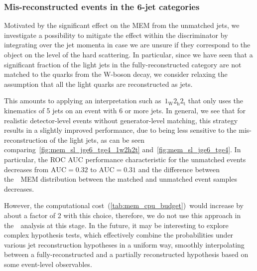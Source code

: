 \subsubsection{Mis-reconstructed events in the 6-jet categories}
Motivated by the significant effect on the MEM from the unmatched jets, we investigate a possibility to mitigate the effect within the discriminator by integrating over the jet momenta in case we are unsure if they correspond to the object on the level of the hard scattering. In particular, since we have seen that a significant fraction of the light jets in the fully-reconstructed category are not matched to the quarks from the W-boson decay, we consider relaxing the assumption that all the light quarks are reconstructed as jets.

This amounts to applying an interpretation such as~$1_{\mathrm{W}} 2_{\mathrm{h}} 2_{\mathrm{t}}$ that only uses the kinematics of 5 jets on an event with 6 or more jets. In general, we see that for realistic detector-level events without generator-level matching, this strategy results in a slightly improved performance, due to being less sensitive to the mis-reconstruction of the light jets, as can be seen comparing~\cref{fig:mem_sl_jge6_tge4_1w2h2t} and~\cref{fig:mem_sl_jge6_tge4}. In particular, the ROC AUC performance characteristic for the unmatched events decreases from $\mathrm{AUC} = 0.32$ to $\mathrm{AUC} = 0.31$ and the difference between the~\ttHbb~MEM distribution between the matched and unmatched event samples decreases.

However, the computational cost~(\cref{tab:mem_cpu_budget})~would increase by about a factor of 2 with this choice, therefore, we do not use this approach in the~\ttHbb~analysis at this stage. In the future, it may be interesting to explore complex hypothesis tests, which effectively combine the probabilities under various jet reconstruction hypotheses in a uniform way, smoothly interpolating between a fully-reconstructed and a partially reconstructed hypothesis based on some event-level observables.

